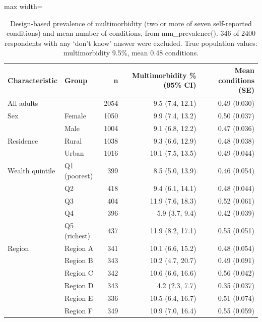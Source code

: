 \begin{table}[htbp]

\caption{\label{tab:tab_multimorbidity}Design-based prevalence of multimorbidity (two or more of seven self-reported conditions) and mean number of conditions, from mm\_prevalence(). 346 of 2400 respondents with any `don't know' answer were excluded. True population values: multimorbidity 9.5\%, mean 0.48 conditions.}
\centering
\small
\begin{adjustbox}{max width=\linewidth}
\begin{tabular}{llrrr}
\toprule
Characteristic & Group & n & Multimorbidity \% (95\% CI) & Mean conditions (SE)\\
\midrule
All adults &  & 2054 & 9.5 (7.4, 12.1) & 0.49 (0.030)\\
Sex & Female & 1050 & 9.9 (7.4, 13.2) & 0.50 (0.037)\\
 & Male & 1004 & 9.1 (6.8, 12.2) & 0.47 (0.036)\\
Residence & Rural & 1038 & 9.3 (6.6, 12.9) & 0.48 (0.038)\\
 & Urban & 1016 & 10.1 (7.5, 13.5) & 0.49 (0.044)\\
Wealth quintile & Q1 (poorest) & 399 & 8.5 (5.0, 13.9) & 0.46 (0.054)\\
 & Q2 & 418 & 9.4 (6.1, 14.1) & 0.48 (0.044)\\
 & Q3 & 404 & 11.9 (7.6, 18.3) & 0.52 (0.061)\\
 & Q4 & 396 & 5.9 (3.7, 9.4) & 0.42 (0.039)\\
 & Q5 (richest) & 437 & 11.9 (8.2, 17.1) & 0.55 (0.051)\\
Region & Region A & 341 & 10.1 (6.6, 15.2) & 0.48 (0.054)\\
 & Region B & 343 & 10.2 (4.7, 20.7) & 0.49 (0.091)\\
 & Region C & 342 & 10.6 (6.6, 16.6) & 0.56 (0.042)\\
 & Region D & 343 & 4.2 (2.3, 7.7) & 0.35 (0.037)\\
 & Region E & 336 & 10.5 (6.4, 16.7) & 0.51 (0.074)\\
 & Region F & 349 & 10.9 (7.0, 16.4) & 0.55 (0.059)\\
\bottomrule
\end{tabular}
\end{adjustbox}
\end{table}
